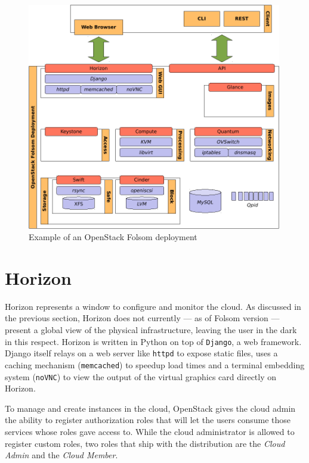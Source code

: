 \begin{figure}[tbp]
\begin{center}
\includegraphics[width=0.99\textwidth]{imagenes/011.pdf}
 \caption{Example of an OpenStack Folsom deployment}
\label{fig:despliegueos}
\end{center}
\end{figure}

\section{Horizon}\label{sec:horizon}
\noindent Horizon represents a window to configure and monitor the cloud. As discussed in the previous section, Horizon does not currently --- as of Folsom version --- present a global view of the physical infrastructure, leaving the user in the dark in this respect. Horizon is written in Python on top of \texttt{Django}, a web framework. Django itself relays on a web server like \texttt{httpd} to expose static files, uses a caching mechanism (\texttt{memcached}) to speedup load times and a terminal embedding system (\texttt{noVNC}) to view the output of the virtual graphics card directly on Horizon.

To manage and create instances in the cloud, OpenStack gives the cloud admin the ability to register authorization roles that will let the users consume those services whose roles gave access to. While the cloud administrator is allowed to register custom roles, two roles that ship with the distribution are the \emph{Cloud Admin} and the \emph{Cloud Member}.

